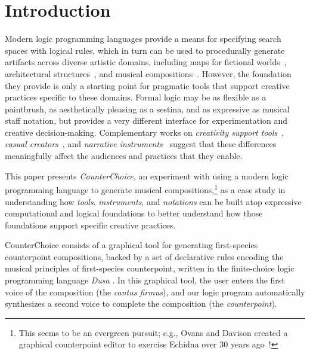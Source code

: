 \section{Introduction}
\label{sec:introduction}
Modern logic programming languages provide a means for specifying
search spaces with logical rules, which in turn can be used to
procedurally generate artifacts across diverse artistic domains, including
maps for fictional worlds~\cite{smith2011answer,carpenter-tile,madkour2023probabilistic}, architectural
structures~\cite{wonka2003instant,muller2006procedural,van2020declarative},
and musical compositions~\cite{boenn-asp,everardo2011armin}.
However, the foundation they provide is only a starting
point for pragmatic tools that support creative practices specific
to these domains. 
Formal logic may be as flexible as a paintbrush, as aesthetically pleasing
as a sestina, and as expressive as musical staff notation, but provides a
very different interface for experimentation and creative decision-making.
Complementary works on {\em creativity support
tools}~\cite{shneiderman2002creativity}, 
{\em casual creators}~\cite{compton-casual}, 
and {\em narrative instruments}~\cite{kreminski2021toward}
suggest that these differences meaningfully
affect the audiences and practices that they
enable.

This paper presents \emph{CounterChoice}, an experiment with using a modern
logic programming language to generate musical compositions,\!\footnote{This seems to be an evergreen pursuit; e.g., Ovans and Davison created a graphical counterpoint editor to exercise Echidna over 30 years ago~\cite{ovans-interative}!} as a case study in
understanding how {\em tools}, {\em instruments}, and {\em notations} can be
built atop expressive computational and logical foundations to better understand
how those foundations support specific creative practices.

CounterChoice consists of a graphical tool for generating first-species
counterpoint compositions, backed by a set of declarative rules encoding the
musical principles of first-species counterpoint, written in the finite-choice
logic programming language \emph{Dusa} \cite{martens2025finite}. In this
graphical tool, the user enters the first voice of the composition (the
\emph{cantus firmus}), and our logic program automatically synthesizes a second
voice to complete the composition (the \emph{counterpoint}).

